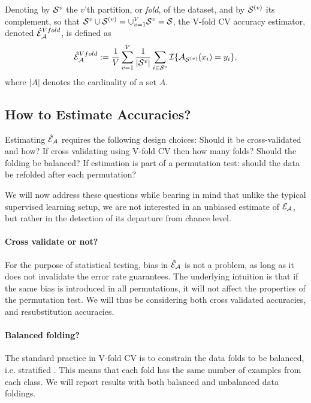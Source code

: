 \documentclass[12pt,a4paper]{article}
\begin{document}
\begin{definition}
\label{def:v-fold}
Denoting by $\mathcal{S}^{v}$ the $v$'th partition, or \emph{fold}, of the dataset, and by $\mathcal{S}^{(v)}$ its complement, so that $\mathcal{S}^{v} \cup \mathcal{S}^{(v)}=\cup_{v=1}^V \mathcal{S}^{v}=\mathcal{S}$, the V-fold CV accuracy estimator, denoted $\hat{\mathcal{E}}_{\mathcal{A}}^{Vfold}$, is defined as 	
\begin{align}
	\hat{\mathcal{E}}_{\mathcal{A}}^{Vfold} := 
	\frac 1V \sum_{v=1}^{V} \frac{1}{|\mathcal{S}^v|} \sum_{i \in \mathcal{S}^{v}} \mathcal{I}{\{ \mathcal{A}_{\mathcal{S}^{(v)}}(x_i)=y_i \}},
\end{align}
where $|A|$ denotes the cardinality of a set $A$.
\end{definition}




\subsection{How to Estimate Accuracies?}
\label{sec:considerations}

Estimating $\hat{\mathcal{E}}_{\mathcal{A}}$ requires the following design choices: 
Should it be cross-validated and how? 
If cross validating using V-fold CV then how many folds? 
Should the folding be balanced?
If estimation is part of a permutation test: should the data be refolded after each permutation? 

We will now address these questions while bearing in mind that unlike the typical supervised learning setup, we are not interested in an unbiased estimate of $\mathcal{E}_{\mathcal{A}}$, but rather in the detection of its departure from chance level. 

\paragraph{Cross validate or not?}
For the purpose of statistical testing, bias in $\hat{\mathcal{E}}_{\mathcal{A}}$ is not a problem, as long as it does not invalidate the error rate guarantees. 
The underlying intuition is that if the same bias is introduced in all permutations, it will not affect the properties of the permutation test. 
We will thus be considering both cross validated accuracies, and resubstitution accuracies.


\paragraph{Balanced folding?}
The standard practice in V-fold CV is to constrain the data folds to be balanced, i.e. stratified \citep[e.g.][]{ojala_permutation_2010}.
This means that each fold has the same number of examples from each class. 
We will report results with both balanced and unbalanced data foldings. 
\end{document}

